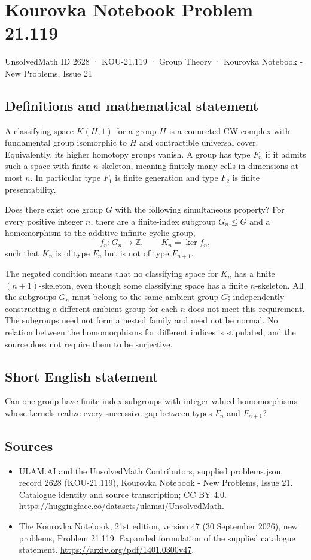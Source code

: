 \documentclass[11pt,a4paper]{article}
\begin{document}
\section*{Kourovka Notebook Problem 21.119}\label{2628}
{\small UnsolvedMath ID 2628 · KOU-21.119 · Group Theory · Kourovka Notebook - New Problems, Issue 21}
\subsection{Definitions and mathematical statement}
A classifying space $K(H,1)$ for a group $H$ is a connected CW-complex with fundamental group isomorphic to $H$ and contractible universal cover. Equivalently, its higher homotopy groups vanish. A group has type $F_n$ if it admits such a space with finite $n$-skeleton, meaning finitely many cells in dimensions at most $n$. In particular type $F_1$ is finite generation and type $F_2$ is finite presentability.

Does there exist one group $G$ with the following simultaneous property? For every positive integer $n$, there are a finite-index subgroup $G_n\le G$ and a homomorphism to the additive infinite cyclic group,
\[
 f_n:G_n\longrightarrow\mathbb Z,
 \qquad K_n=\ker f_n,
\]
such that $K_n$ is of type $F_n$ but is not of type $F_{n+1}$.

The negated condition means that no classifying space for $K_n$ has a finite $(n+1)$-skeleton, even though some classifying space has a finite $n$-skeleton. All the subgroups $G_n$ must belong to the same ambient group $G$; independently constructing a different ambient group for each $n$ does not meet this requirement. The subgroups need not form a nested family and need not be normal. No relation between the homomorphisms for different indices is stipulated, and the source does not require them to be surjective.
\subsection{Short English statement}
Can one group have finite-index subgroups with integer-valued homomorphisms whose kernels realize every successive gap between types $F_n$ and $F_{n+1}$?
\subsection{Sources}
\begin{itemize}
\item[S1] ULAM.AI and the UnsolvedMath Contributors, supplied problems.json, record 2628 (KOU-21.119), Kourovka Notebook - New Problems, Issue 21. Catalogue identity and source transcription; CC BY 4.0.
\url{https://huggingface.co/datasets/ulamai/UnsolvedMath}.
\item[S2] The Kourovka Notebook, 21st edition, version 47 (30 September 2026), new problems, Problem 21.119. Expanded formulation of the supplied catalogue statement.
\url{https://arxiv.org/pdf/1401.0300v47}.
\end{itemize}
\end{document}
